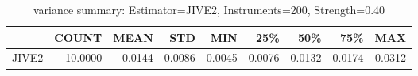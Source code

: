 \begin{table}[ht]
\centering
\caption{variance summary: Estimator=JIVE2, Instruments=200, Strength=0.40}
\begin{tabular}{lrrrrrrrr}
\toprule
 & COUNT & MEAN & STD & MIN & 25\% & 50\% & 75\% & MAX \\
\midrule
JIVE2 & 10.0000 & 0.0144 & 0.0086 & 0.0045 & 0.0076 & 0.0132 & 0.0174 & 0.0312 \\
\bottomrule
\end{tabular}
\end{table}
